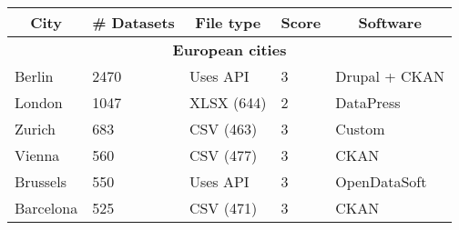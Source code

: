 \begin{table}[!ht]
  \onehalfspacing
  \centering
  \begin{tabular}{|lllll|}
    \hline
    \multicolumn{1}{|c|}{\textbf{City}} & \multicolumn{1}{c|}{\textbf{\# Datasets}} & \multicolumn{1}{c|}{\textbf{File type}} & \multicolumn{1}{c|}{\textbf{Score}} & \multicolumn{1}{c|}{\textbf{Software}} \\ \hline
    \multicolumn{5}{|c|}{\textbf{European cities}}    \\ \hline
    \multicolumn{1}{|l|}{Berlin}                      & \multicolumn{1}{|l|}{2470}                                             & \multicolumn{1}{|l|}{Uses \acs{API}}                                                  & \multicolumn{1}{|l|}{3}        & \multicolumn{1}{|l|}{Drupal + CKAN}                                   \\ \hline
    \multicolumn{1}{|l|}{London}                      & \multicolumn{1}{|l|}{1047}                                             & \multicolumn{1}{|l|}{XLSX (644)}                                                      & \multicolumn{1}{|l|}{2}        & \multicolumn{1}{|l|}{DataPress}                                   \\ \hline
    \multicolumn{1}{|l|}{Zurich}                      & \multicolumn{1}{|l|}{683}                                              & \multicolumn{1}{|l|}{CSV (463)}                                                       & \multicolumn{1}{|l|}{3}        & \multicolumn{1}{|l|}{Custom}                                   \\ \hline
    \multicolumn{1}{|l|}{Vienna}                      & \multicolumn{1}{|l|}{560}                                              & \multicolumn{1}{|l|}{CSV (477)}                                                       & \multicolumn{1}{|l|}{3}        & \multicolumn{1}{|l|}{CKAN}                                   \\ \hline
    \multicolumn{1}{|l|}{Brussels}                   & \multicolumn{1}{|l|}{550}                                              & \multicolumn{1}{|l|}{Uses \acs{API}}                                                  & \multicolumn{1}{|l|}{3}        & \multicolumn{1}{|l|}{OpenDataSoft}                                   \\ \hline
    \multicolumn{1}{|l|}{Barcelona}                   & \multicolumn{1}{|l|}{525}                                              & \multicolumn{1}{|l|}{CSV (471)}                                                       & \multicolumn{1}{|l|}{3}        & \multicolumn{1}{|l|}{CKAN}                                   \\ \hline

\end{tabular}
\end{table}
